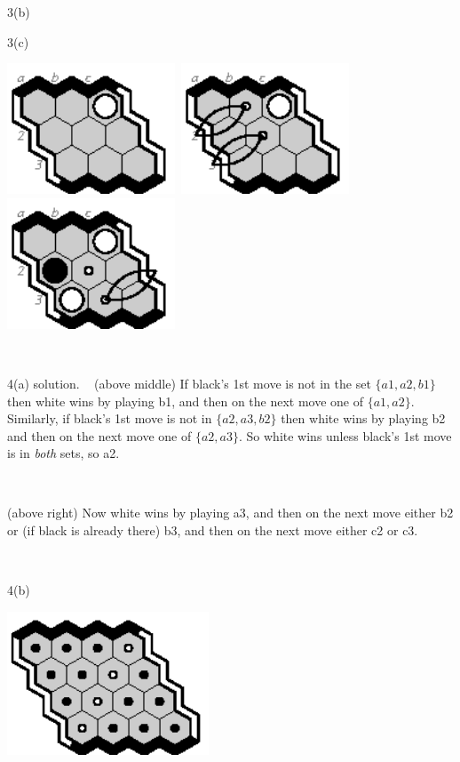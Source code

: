 \documentclass[12pt]{article}
\begin{document}
3(b)
\vfill

3(c)
\vfill~

\newpage
\noindent
\includegraphics[width=50mm]{fz/pix/3strat.eps}\
\includegraphics[width=50mm]{fz/pix/3strat0.eps}\
\includegraphics[width=50mm]{fz/pix/3strat1.eps}

~

4(a) solution. ~
(above middle)
If black's 1st move is not in the set $\{a1,a2,b1\}$ then
white wins by playing b1, and then on the next move
one of $\{a1,a2\}$. Similarly, if black's 1st move is not
in $\{a2,a3,b2\}$ then white wins by playing b2
and then on the next move one of $\{a2,a3\}$.
So white wins unless black's 1st move is in {\em both} sets, so a2.

~

(above right)
Now white wins by playing a3, and then on the next move
either b2 or (if black is already there) b3, and then 
on the next move either c2 or c3.

~

4(b)
\begin{center}
\includegraphics[width=60mm]{fz/pix/4x4.winners.eps}\
\end{center}
\end{document}

